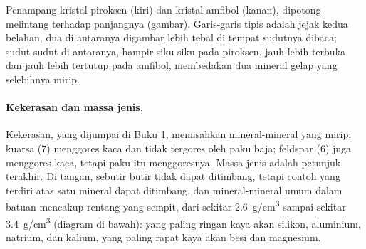 \begin{omfigure}

{\small Penampang kristal piroksen (kiri) dan kristal amfibol (kanan), dipotong
melintang terhadap panjangnya (gambar). Garis-garis tipis adalah jejak kedua
belahan, dua di antaranya digambar lebih tebal di tempat sudutnya dibaca;
sudut-sudut di antaranya, hampir siku-siku pada piroksen, jauh lebih terbuka dan
jauh lebih tertutup pada amfibol, membedakan dua mineral gelap yang selebihnya
mirip.}
\end{omfigure}

\paragraph{Kekerasan dan massa jenis.} Kekerasan, yang dijumpai di Buku 1,
memisahkan mineral-mineral yang mirip: kuarsa (7) menggores kaca dan tidak
tergores oleh paku baja; feldspar (6) juga menggores kaca, tetapi paku itu
menggoresnya. Massa jenis adalah petunjuk terakhir. Di tangan, sebutir butir tidak
dapat ditimbang, tetapi contoh yang terdiri atas satu mineral dapat ditimbang, dan
mineral-mineral umum dalam batuan mencakup rentang yang sempit, dari sekitar
\qty{2.6}{g/cm^3} sampai sekitar \qty{3.4}{g/cm^3} (diagram di bawah): yang
paling ringan kaya akan silikon, aluminium, natrium, dan kalium, yang paling rapat
kaya akan besi dan magnesium.

